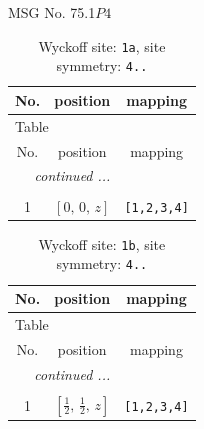 \documentclass[fleqn,8pt]{jsarticle}
\begin{document}
\setcounter{MaxMatrixCols}{32}

\renewcommand{\tablename}{Table~}
\renewcommand{\figurename}{Figure~}
\begin{center}
\LARGE
MSG No. 75.1\quad$P4$
\end{center}
\renewcommand{\arraystretch}{1.2}
\begin{longtable}{ccc}
\caption{Wyckoff site: {\tt 1a}, site symmetry: {\tt 4..}}
 \\
 \hline \hline
No. & position & mapping \\ \hline \endfirsthead

\multicolumn{2}{l}{\tablename\ \thetable{}} \\
 \hline \hline
No. & position & mapping \\ \hline \endhead

 \hline \hline
\multicolumn{2}{r}{\footnotesize\it continued ...} \\ \endfoot

 \hline \hline
\multicolumn{2}{r}{} \\ \endlastfoot

1 & $\left[ 0,\, 0,\, z \right]$ & {\tt [1,2,3,4]} \\
\end{longtable}
\renewcommand{\arraystretch}{1.2}
\begin{longtable}{ccc}
\caption{Wyckoff site: {\tt 1b}, site symmetry: {\tt 4..}}
 \\
 \hline \hline
No. & position & mapping \\ \hline \endfirsthead

\multicolumn{2}{l}{\tablename\ \thetable{}} \\
 \hline \hline
No. & position & mapping \\ \hline \endhead

 \hline \hline
\multicolumn{2}{r}{\footnotesize\it continued ...} \\ \endfoot

 \hline \hline
\multicolumn{2}{r}{} \\ \endlastfoot

1 & $\left[ \frac{1}{2},\, \frac{1}{2},\, z \right]$ & {\tt [1,2,3,4]} \\
\end{longtable}
\renewcommand{\arraystretch}{1.2}
\end{document}
